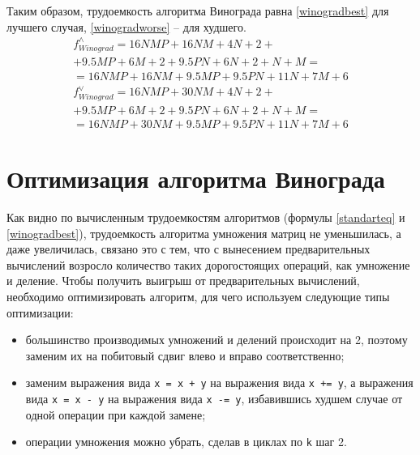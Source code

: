 Таким образом, трудоемкость алгоритма Винограда равна \ref{winogradbest} для
лучшего случая, \ref{winogradworse} -- для худшего.
    \begin{multline}\label{winogradbest}
        f_{Winograd}^{\wedge} = 16NMP + 16NM + 4N + 2 + \\
                                + 9.5MP + 6M + 2
                                + 9.5PN + 6N + 2 + N + M = \\
                                = 16NMP + 16NM + 9.5MP
                                + 9.5PN + 11N + 7M + 6
    \end{multline}
    \begin{multline}\label{winogradworse}
        f_{Winograd}^{\vee} = 16NMP + 30NM + 4N + 2 + \\
                                + 9.5MP + 6M + 2
                                + 9.5PN + 6N + 2 + N + M = \\
                                = 16NMP + 30NM + 9.5MP
                                + 9.5PN + 11N + 7M + 6
    \end{multline}

\section{Оптимизация алгоритма Винограда}

Как видно по вычисленным трудоемкостям алгоритмов (формулы \ref{standarteq} и
\ref{winogradbest}), трудоемкость алгоритма умножения матриц не уменьшилась, а
даже увеличилась, связано это с тем, что с вынесением предварительных
вычислений возросло количество таких дорогостоящих операций, как умножение и
деление. Чтобы получить выигрыш от предварительных вычислений, необходимо
оптимизировать алгоритм, для чего используем следующие типы оптимизации:
\begin{itemize}[left=\parindent]
    \item большинство производимых умножений и делений происходит на 2, поэтому
          заменим их на побитовый сдвиг влево и вправо соответственно;
    \item заменим выражения вида \texttt{x = x + y} на выражения вида \texttt{x
        += y}, а выражения вида \texttt{x = x - y} на выражения вида \texttt{x
        -= y}, избавившись худшем случае от одной операции при каждой замене;
    \item операции умножения можно убрать, сделав в циклах по \texttt{k} шаг 2.
\end{itemize}


